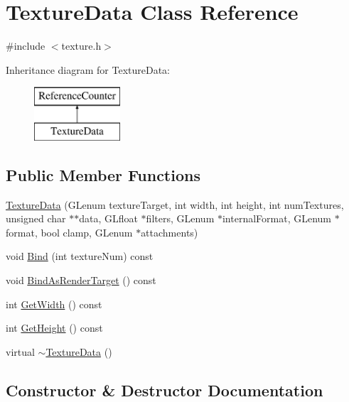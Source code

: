 \hypertarget{class_texture_data}{}\section{Texture\+Data Class Reference}
\label{class_texture_data}


{\ttfamily \#include $<$texture.\+h$>$}

Inheritance diagram for Texture\+Data\+:\begin{figure}[H]
\begin{center}
\leavevmode
\includegraphics[height=2.000000cm]{class_texture_data}
\end{center}
\end{figure}
\subsection*{Public Member Functions}
\begin{DoxyCompactItemize}
\item 
\hyperlink{class_texture_data_ab46f64eb53b9f4dd34c936620c0f6ddb}{Texture\+Data} (G\+Lenum texture\+Target, int width, int height, int num\+Textures, unsigned char $\ast$$\ast$data, G\+Lfloat $\ast$filters, G\+Lenum $\ast$internal\+Format, G\+Lenum $\ast$format, bool clamp, G\+Lenum $\ast$attachments)
\item 
void \hyperlink{class_texture_data_aded7e6ed8e417bf39f815a671a0d84f8}{Bind} (int texture\+Num) const 
\item 
void \hyperlink{class_texture_data_a8d9a3f90f7656e1740e7ed3462f6458f}{Bind\+As\+Render\+Target} () const 
\item 
int \hyperlink{class_texture_data_ae8ddcff5940d8c244f25cf572b38d210}{Get\+Width} () const 
\item 
int \hyperlink{class_texture_data_ac812a9adc3ebb6f24a367c57aaf53f15}{Get\+Height} () const 
\item 
virtual \hyperlink{class_texture_data_ab5ba8c4b65adf5f919450fbd8374001e}{$\sim$\+Texture\+Data} ()
\end{DoxyCompactItemize}


\subsection{Constructor \& Destructor Documentation}
\hypertarget{class_texture_data_ab46f64eb53b9f4dd34c936620c0f6ddb}{}
